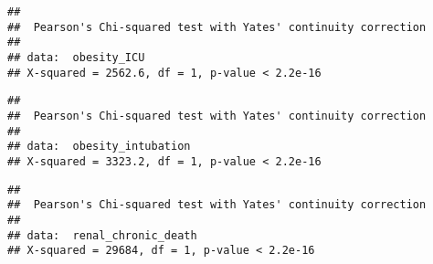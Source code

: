 \documentclass[
]{article}
\newenvironment{Shaded}{\begin{snugshade}}{\end{snugshade}}
\newcommand{\CommentTok}[1]{\textcolor[rgb]{0.56,0.35,0.01}{\textit{#1}}}
\newcommand{\FunctionTok}[1]{\textcolor[rgb]{0.00,0.00,0.00}{#1}}
\newcommand{\NormalTok}[1]{#1}
\newcommand{\OtherTok}[1]{\textcolor[rgb]{0.56,0.35,0.01}{#1}}
\newcommand{\SpecialCharTok}[1]{\textcolor[rgb]{0.00,0.00,0.00}{#1}}
\begin{document}
\begin{Shaded}
\end{Shaded}

\begin{verbatim}
## 
##  Pearson's Chi-squared test with Yates' continuity correction
## 
## data:  obesity_ICU
## X-squared = 2562.6, df = 1, p-value < 2.2e-16
\end{verbatim}

\begin{Shaded}
\end{Shaded}

\begin{verbatim}
## 
##  Pearson's Chi-squared test with Yates' continuity correction
## 
## data:  obesity_intubation
## X-squared = 3323.2, df = 1, p-value < 2.2e-16
\end{verbatim}

\begin{Shaded}
\end{Shaded}

\begin{verbatim}
## 
##  Pearson's Chi-squared test with Yates' continuity correction
## 
## data:  renal_chronic_death
## X-squared = 29684, df = 1, p-value < 2.2e-16
\end{verbatim}
\end{document}

